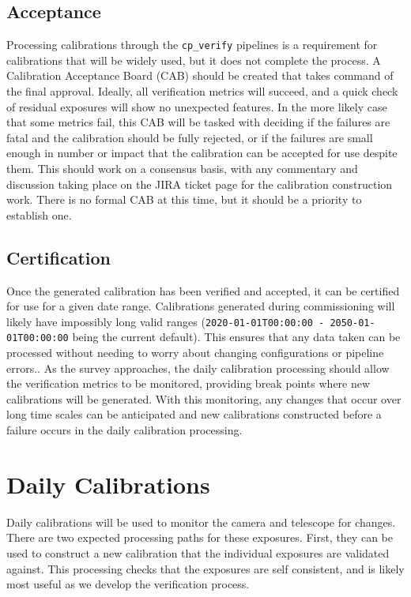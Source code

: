 \documentclass[DM,authoryear,toc]{lsstdoc}
\begin{document}
\subsection{Acceptance}

Processing calibrations through the \verb|cp_verify| pipelines is a requirement for calibrations that will be widely used, but it does not complete the process.  A Calibration Acceptance Board (CAB) should be created that takes command of the final approval.  Ideally, all verification metrics will succeed, and a quick check of residual exposures will show no unexpected features.  In the more likely case that some metrics fail, this CAB will be tasked with deciding if the failures are fatal and the calibration should be fully rejected, or if the failures are small enough in number or impact that the calibration can be accepted for use despite them.  This should work on a consensus basis, with any commentary and discussion taking place on the JIRA ticket page for the calibration construction work.  There is no formal CAB at this time, but it should be a priority to establish one.

\subsection{Certification}

Once the generated calibration has been verified and accepted, it can be certified for use for a given date range.  Calibrations generated during commissioning will likely have impossibly long valid ranges (\verb|2020-01-01T00:00:00 - 2050-01-01T00:00:00| being the current default). This ensures that any data taken can be processed without needing to worry about changing configurations or pipeline errors..  As the survey approaches, the daily calibration processing should allow the verification metrics to be monitored, providing break points where new calibrations will be generated.  With this monitoring, any changes that occur over long time scales can be anticipated and new calibrations constructed before a failure occurs in the daily calibration processing.

\section{Daily Calibrations}

Daily calibrations will be used to monitor the camera and telescope for changes.  There are two expected processing paths for these exposures.  First, they can be used to construct a new calibration that the individual exposures are validated against.  This processing checks that the exposures are self consistent, and is likely most useful as we develop the verification process.
\end{document}
